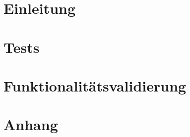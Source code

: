 

	\maketitle
	\setcounter{tocdepth}{1}
	\tableofcontents

	\chapter{Einleitung}
		
	\chapter{Tests}
	\label{chap:test}
		
	\chapter{Funktionalitätsvalidierung}
		
	\chapter{Anhang}
	\label{anhang}

